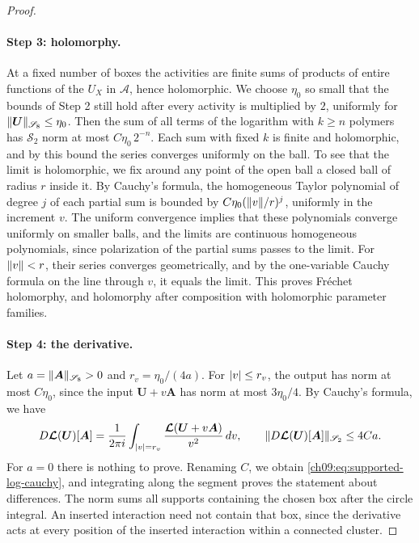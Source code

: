 \begin{proof}
\paragraph{Step 3: holomorphy.}
At a fixed number of boxes the activities are finite sums of products of entire functions of the $U_X$ in $\mathscr A$, hence holomorphic. We choose $\eta_0$ so small that the bounds of Step 2 still hold after every activity is multiplied by $2$, uniformly for $\lVert \boldsymbol U\rVert_{\mathscr S_8}\le\eta_0$. Then the sum of all terms of the logarithm with $k\ge n$ polymers has $\mathscr S_2$ norm at most $C\eta_0\,2^{-n}$. Each sum with fixed $k$ is finite and holomorphic, and by this bound the series converges uniformly on the ball. To see that the limit is holomorphic, we fix around any point of the open ball a closed ball of radius $r$ inside it. By Cauchy's formula, the homogeneous Taylor polynomial of degree $j$ of each partial sum is bounded by $C\eta_0(\lVert v\rVert/r)^j$, uniformly in the increment $v$. The uniform convergence implies that these polynomials converge uniformly on smaller balls, and the limits are continuous homogeneous polynomials, since polarization of the partial sums passes to the limit. For $\lVert v\rVert<r$, their series converges geometrically, and by the one-variable Cauchy formula on the line through $v$, it equals the limit. This proves Fréchet holomorphy, and holomorphy after composition with holomorphic parameter families.

\paragraph{Step 4: the derivative.}
Let $a=\lVert \boldsymbol A\rVert_{\mathscr S_8}>0$ and $r_v=\eta_0/(4a)$. For $\lvert v\rvert\le r_v$, the output has norm at most $C\eta_0$, since the input $\boldsymbol U+v\boldsymbol A$ has norm at most $3\eta_0/4$. By Cauchy's formula, we have
\[
 D\boldsymbol{\mathcal L}(\boldsymbol U)[\boldsymbol A]=\frac1{2\pi i}\int_{\lvert v\rvert=r_v}\frac{\boldsymbol{\mathcal L}(\boldsymbol U+v\boldsymbol A)}{v^2}\,dv,
 \qquad \lVert D\boldsymbol{\mathcal L}(\boldsymbol U)[\boldsymbol A]\rVert_{\mathscr S_2}\le4Ca.
\]
For $a=0$ there is nothing to prove. Renaming $C$, we obtain \eqref{ch09:eq:supported-log-cauchy}, and integrating along the segment proves the statement about differences. The norm sums all supports containing the chosen box after the circle integral. An inserted interaction need not contain that box, since the derivative acts at every position of the inserted interaction within a connected cluster.


\end{proof}
